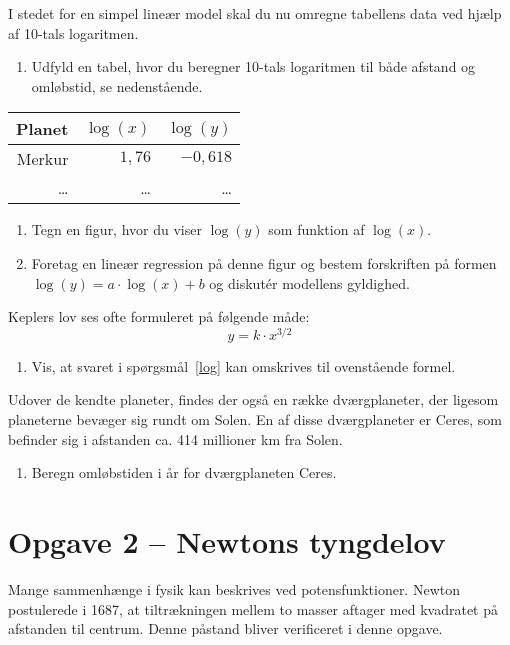 \documentclass[12pt,oneside,a4paper]{article}
\theoremstyle{plain}
\begin{document}
I stedet for en simpel lineær model skal du nu omregne tabellens data ved hjælp af 
10-tals logaritmen.
\begin{enumerate}[label=(\alph*) ,resume]
    \item Udfyld en tabel, hvor du beregner 10-tals logaritmen til både afstand
        og omløbstid, se nedenstående.
\end{enumerate}

\begin{center}
\begin{tabular}{|r|r|r|}
    \hline
    Planet  & $\log(x)$   & $\log(y)$ \\
    \hline 
    Merkur  &  $1,76$ &   $-0,618$ \\
    \ldots  & \ldots    & \ldots  \\
    \hline 
\end{tabular}
\end{center}

\begin{enumerate}[label=(\alph*) ,resume]
    \item Tegn en figur, hvor du viser $\log(y)$ som funktion af $\log(x)$.
    \item Foretag en lineær regression på denne figur og bestem forskriften på formen
        $\log(y) = a\cdot\log(x)+b$ og diskutér modellens gyldighed. \label{log}
\end{enumerate}

Keplers lov ses ofte formuleret på følgende måde:
$$
y = k \cdot x^{3/2}
$$
\begin{enumerate}[label=(\alph*) ,resume]
    \item Vis, at svaret i spørgsmål~\ref{log} kan omskrives til ovenstående formel.
\end{enumerate}


Udover de kendte planeter, findes der også en række dværgplaneter, der
ligesom planeterne bevæger sig rundt om Solen. En af disse dværgplaneter er
Ceres, som befinder sig i afstanden ca. 414 millioner km fra Solen.

\begin{enumerate}[label=(\alph*) ,resume]
    \item Beregn omløbstiden i år for dværgplaneten Ceres.
\end{enumerate}

\section*{Opgave 2 -- Newtons tyngdelov}
Mange sammenhænge i fysik kan beskrives ved potensfunktioner. Newton
postulerede i 1687, at tiltrækningen mellem to masser aftager med kvadratet på
afstanden til centrum.  Denne påstand bliver verificeret i denne opgave.
\end{document}

